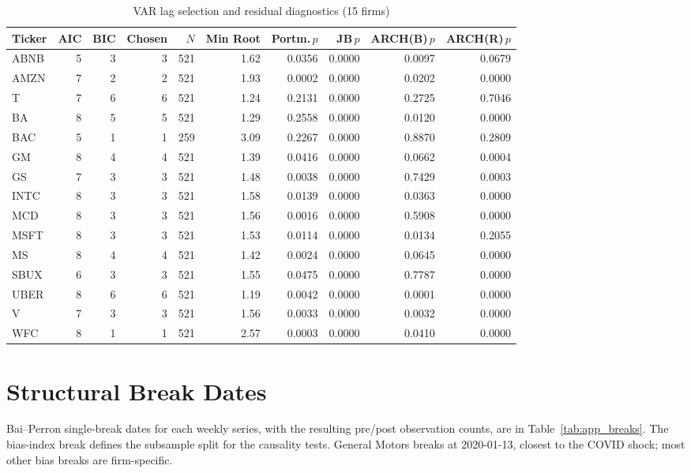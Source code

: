 \documentclass[conference]{IEEEtran}
\begin{document}
\begin{table}[!t]
\caption{VAR lag selection and residual diagnostics (15 firms)}
\label{tab:app_varspec}
\centering
\small
\begin{tabular}{lrrrrrrrrr}
\toprule
Ticker & AIC & BIC & Chosen & $N$ & Min Root & Portm.\,$p$ & JB\,$p$ & ARCH(B)\,$p$ & ARCH(R)\,$p$ \\
\midrule
ABNB & 5 & 3 & 3 & 521 & 1.62 & 0.0356 & 0.0000 & 0.0097 & 0.0679 \\
AMZN & 7 & 2 & 2 & 521 & 1.93 & 0.0002 & 0.0000 & 0.0202 & 0.0000 \\
T    & 7 & 6 & 6 & 521 & 1.24 & 0.2131 & 0.0000 & 0.2725 & 0.7046 \\
BA   & 8 & 5 & 5 & 521 & 1.29 & 0.2558 & 0.0000 & 0.0120 & 0.0000 \\
BAC  & 5 & 1 & 1 & 259 & 3.09 & 0.2267 & 0.0000 & 0.8870 & 0.2809 \\
GM   & 8 & 4 & 4 & 521 & 1.39 & 0.0416 & 0.0000 & 0.0662 & 0.0004 \\
GS   & 7 & 3 & 3 & 521 & 1.48 & 0.0038 & 0.0000 & 0.7429 & 0.0003 \\
INTC & 8 & 3 & 3 & 521 & 1.58 & 0.0139 & 0.0000 & 0.0363 & 0.0000 \\
MCD  & 8 & 3 & 3 & 521 & 1.56 & 0.0016 & 0.0000 & 0.5908 & 0.0000 \\
MSFT & 8 & 3 & 3 & 521 & 1.53 & 0.0114 & 0.0000 & 0.0134 & 0.2055 \\
MS   & 8 & 4 & 4 & 521 & 1.42 & 0.0024 & 0.0000 & 0.0645 & 0.0000 \\
SBUX & 6 & 3 & 3 & 521 & 1.55 & 0.0475 & 0.0000 & 0.7787 & 0.0000 \\
UBER & 8 & 6 & 6 & 521 & 1.19 & 0.0042 & 0.0000 & 0.0001 & 0.0000 \\
V    & 7 & 3 & 3 & 521 & 1.56 & 0.0033 & 0.0000 & 0.0032 & 0.0000 \\
WFC  & 8 & 1 & 1 & 521 & 2.57 & 0.0003 & 0.0000 & 0.0410 & 0.0000 \\
\bottomrule
\end{tabular}
\end{table}

\section{Structural Break Dates}
\label{app:breaks}
Bai--Perron single-break dates for each weekly series, with the resulting pre/post
observation counts, are in Table~\ref{tab:app_breaks}. The bias-index break
defines the subsample split for the causality tests. General Motors breaks at
2020-01-13, closest to the COVID shock; most other bias breaks are firm-specific.
\end{document}
